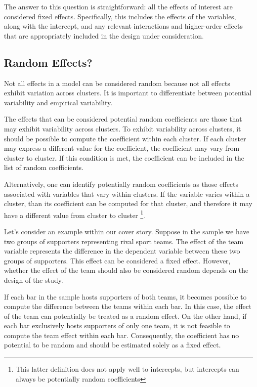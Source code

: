 \documentclass[
]{book}
\begin{document}
The answer to this question is straightforward: all the effects of interest are considered fixed effects. Specifically, this includes the effects of the variables, along with the intercept, and any relevant interactions and higher-order effects that are appropriately included in the design under consideration.

\hypertarget{random-effects}{%
\subsection{Random Effects?}\label{random-effects}}

Not all effects in a model can be considered random because not all effects exhibit variation across clusters. It is important to differentiate between potential variability and empirical variability.

The effects that can be considered potential random coefficients are those that may exhibit variability across clusters. To exhibit variability across clusters, it should be possible to compute the coefficient within each cluster. If each cluster may express a different value for the coefficient, the coefficient may vary from cluster to cluster. If this condition is met, the coefficient can be included in the list of random coefficients.

Alternatively, one can identify potentially random coefficients as those effects associated with variables that vary within-clusters. If the variable varies within a cluster, than its coefficient can be computed for that cluster, and therefore it may have a different value from cluster to cluster \footnote{This latter definition does not apply well to intercepts, but intercepts can always be potentially random coefficients}.

Let's consider an example within our cover story. Suppose in the sample we have two groups of supporters representing rival sport teams. The effect of the team variable represents the difference in the dependent variable between these two groups of supporters. This effect can be considered a fixed effect. However, whether the effect of the team should also be considered random depends on the design of the study.

If each bar in the sample hosts supporters of both teams, it becomes possible to compute the difference between the teams within each bar. In this case, the effect of the team can potentially be treated as a random effect. On the other hand, if each bar exclusively hosts supporters of only one team, it is not feasible to compute the team effect within each bar. Consequently, the coefficient has no potential to be random and should be estimated solely as a fixed effect.
\end{document}
